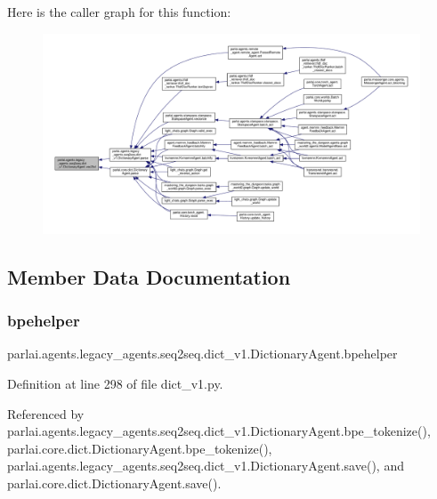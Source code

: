 Here is the caller graph for this function\+:
\nopagebreak
\begin{figure}[H]
\begin{center}
\leavevmode
\includegraphics[width=350pt]{classparlai_1_1agents_1_1legacy__agents_1_1seq2seq_1_1dict__v1_1_1DictionaryAgent_a8dd6e4af55a5f5d05d692198e044c5fe_icgraph}
\end{center}
\end{figure}


\subsection{Member Data Documentation}
\mbox{\label{classparlai_1_1agents_1_1legacy__agents_1_1seq2seq_1_1dict__v1_1_1DictionaryAgent_a0eb34153c5895cc03682b295fa5a7223}} 
\subsubsection{\texorpdfstring{bpehelper}{bpehelper}}
{\footnotesize\ttfamily parlai.\+agents.\+legacy\+\_\+agents.\+seq2seq.\+dict\+\_\+v1.\+Dictionary\+Agent.\+bpehelper}



Definition at line 298 of file dict\+\_\+v1.\+py.



Referenced by parlai.\+agents.\+legacy\+\_\+agents.\+seq2seq.\+dict\+\_\+v1.\+Dictionary\+Agent.\+bpe\+\_\+tokenize(), parlai.\+core.\+dict.\+Dictionary\+Agent.\+bpe\+\_\+tokenize(), parlai.\+agents.\+legacy\+\_\+agents.\+seq2seq.\+dict\+\_\+v1.\+Dictionary\+Agent.\+save(), and parlai.\+core.\+dict.\+Dictionary\+Agent.\+save().

